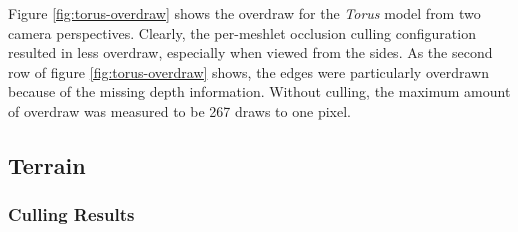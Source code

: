 \noindent
Figure \ref{fig:torus-overdraw} shows the overdraw for the \emph{Torus} model from two 
camera perspectives. Clearly, the per-meshlet occlusion culling configuration resulted 
in less overdraw, especially when viewed from the sides. As the second row of figure 
\ref{fig:torus-overdraw} shows, the edges were particularly overdrawn because of the 
missing depth information. Without culling, the maximum amount of overdraw was measured 
to be 267 draws to one pixel.


\clearpage




\subsection*{Terrain}

\subsubsection*{Culling Results} \label{subsubsec-culling-results-terrain}


